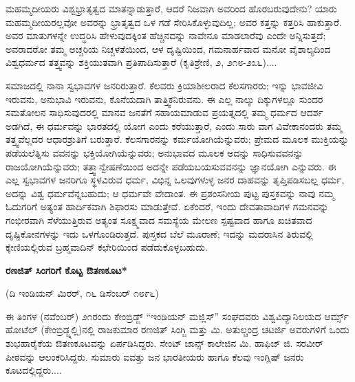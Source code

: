 ಮಹಮ್ಮದೀಯರು ವಿಶ್ವಭ್ರಾತೃತ್ವದ ಮಾತನ್ನಾಡುತ್ತಾರೆ, ಆದರೆ ನಿಜವಾಗಿ ಅವರಿಂದ ಹೊರಬರುವುದೇನು? ಯಾರು ಮಹಮ್ಮದೀಯರಲ್ಲವೋ ಅವರನ್ನು ಭ್ರಾತೃತ್ವದ ಒಳ ಗಡೆ ಸೇರಿಸಿಕೊಳ್ಳುವುದಿಲ್ಲ; ಅವರ ಕತ್ತನ್ನು ಕತ್ತರಿಸಿ ಹಾಕುತ್ತಾರೆ. ಅವರ ಮಾತುಗಳನ್ನೇ ಉದ್ಧರಿಸಿ ಹೇಳುವುದಕ್ಕಿಂತ ಹೆಚ್ಚಿನದನ್ನು ನಾವೇನೂ ಮಾಡಲಾರೆವು ಎಂದೇ ಅನ್ನಿಸುತ್ತದೆ; ಅವರಾದರೋ ತಮ್ಮ ಅಚ್ಚರಿಯ ನಿಚ್ಚಳತೆಯಿಂದ, ಆಳ ದೃಷ್ಟಿಯಿಂದ, ಗಮನಾರ್ಹವಾದ ಮನೋ ವೈಶಾಲ್ಯದಿಂದ ವಿಶ್ವಧರ್ಮದ ತತ್ತ್ವವನ್ನು ಶಕ್ತಿಯುತವಾಗಿ ಪ್ರತಿಪಾದಿಸುತ್ತಾರೆ (ಕೃತಿಶ್ರೇಣಿ, ೨, ೨೧೮-೨೩೬)....

ಸಮಾಜದಲ್ಲಿ ನಾನಾ ಸ್ವಭಾವಗಳ ಜನರಿರುತ್ತಾರೆ. ಕೆಲವರು ಕ್ರಿಯಾಶೀಲರಾದ ಕೆಲಸಗಾರರು; ಇನ್ನು ಭಾವಜೀವಿ ಇರುವನು, ಅನುಭಾವಿ ಇರುವನು, ಕೊನೆಯದಾಗಿ ತಾತ್ತ್ವಿಕನಿರುವನು. ಈ ಎಲ್ಲ ನಾಲ್ಕು ದಿಕ್ಕುಗಳಲ್ಲೂ ಸುಂದರ ಸಮತೋಲನ ಸಾಧಿಸುವುದರಲ್ಲಿ ಮಾನವ ಜನತೆಗೆ ಸಹಾಯಮಾಡುವ ಪ್ರಯತ್ನದಲ್ಲಿ ತಮ್ಮ ಧರ್ಮದ ಆದರ್ಶ ಅಡಗಿದೆ, ಈ ಧರ್ಮವನ್ನು ಭಾರತದಲ್ಲಿ ಯೋಗ ಎಂದು ಕರೆಯುತ್ತಾರೆ, ಎಂದು ಸಾರು ವಾಗ ವಿವೇಕಾನಂದರು ತಮ್ಮ ತತ್ತ್ವವೆಲ್ಲದರ ಆಧಾರಶ್ರುತಿಗೆ ಬರುತ್ತಾರೆ. ಕೆಲಸಗಾರನನ್ನು ಕರ್ಮಯೋಗಿಯೆನ್ನುವರು; ಪ್ರೇಮದ ಮೂಲಕ ಮುಕ್ತಿಯನ್ನು ಪಡೆಯಲೆತ್ನಿಸು ವವನನ್ನು ಭಕ್ತಿಯೋಗಿಯೆನ್ನುವರು; ಅನುಭಾವದ ಮೂಲಕ ಅದನ್ನು ಸಾಧಿಸುವವನನ್ನು ರಾಜಯೋಗಿಯೆನ್ನುವರು; ತತ್ತ್ವಾನ್ವೇಷಣೆಯಿಂದ ಅದನ್ನೇ ಪಡೆಯಬಯಸುವವನನ್ನು ಜ್ಞಾನಯೋಗಿ ಎನ್ನುವರು. ಈ ಎಲ್ಲ ಸ್ವಭಾವಗಳ ಜನರಿಗೂ ಸ್ಥಳವಿರುವ ಧರ್ಮ, ವಿಭಿನ್ನ ಒಲವುಗಳುಳ್ಳ ಜನರ ದಾಹವನ್ನು ತೃಪ್ತಿಪಡಿಸಬಲ್ಲ ಧರ್ಮ, ಅದನ್ನು ವಿಶ್ವ ಧರ್ಮವೆನ್ನಬಹುದು; ಆ ಧರ್ಮವೇ ವೇದಾಂತ. ಈ ಪ್ರಶಂಸನೀಯ ಪುಟ್ಟ ಪುಸ್ತಕವನ್ನು ನಾವು ನಮ್ಮ ಓದುಗರಿಗೆ ಅತ್ಯಂತ ಹಾರ್ದಿಕವಾಗಿ ಶಿಫಾರಸು ಮಾಡುತ್ತೇವೆ. ಏಕೆಂದರೆ, ಇಂದು ದೇವತಾವಾದಿಗಳ ಗಮನವನ್ನು ಗಂಭೀರವಾಗಿ ಸೆಳೆಯುತ್ತಿರುವ ಅತ್ಯಂತ ಸೂಕ್ಷ್ಮವಾದ ಸಮಸ್ಯೆಯ ಮೇಲಣ ಸ್ಪಷ್ಟವಾದ ಹಾಗೂ ಖಚಿತವಾದ ದೃಷ್ಟಿಕೋನಗಳನ್ನು ಇದು ಒಳಗೊಂಡಿರುತ್ತದೆ. ಪುಸ್ತಕದ ಬೆಲೆ ಮೂರಾಣೆ; ಇದನ್ನು ಮದರಾಸಿನ ತಿರುವಲ್ಲಿ ಕ್ಕೇಣಿಯಲ್ಲಿರುವ ಬ್ರಹ್ಮವಾದಿನ್ ಕಛೇರಿಯಿಂದ ಪಡೆದುಕೊಳ್ಳಬಹುದು.

\begin{center}
\textbf{ರಣಜಿತ್ ಸಿಂಗರಿಗೆ ಕೊಟ್ಟ ಔತಣಕೂಟ*}
\end{center}

\begin{center}
(ದಿ ಇಂಡಿಯನ್ ಮಿರರ್, ೧೬ ಡಿಸೆಂಬರ್ ೧೮೯೬)
\end{center}

ಈ ತಿಂಗಳ (ನವೆಂಬರ್) ೨೧ರಂದು ಕೇಂಬ್ರಿಡ್ಜ್ “ಇಂಡಿಯನ್ ಮಜ್ಲಿಸ್” ಸಂಘದವರು ವಿಶ್ವವಿದ್ಯಾನಿಲಯದ ಆರ್ಮ್ಸ್ ಹೋಟೆಲ್ (ಕೇಂಬ್ರಿಡ್ಜ್ನಲ್ಲಿ)ನಲ್ಲಿ ರಾಜಕುಮಾರ ರಣಜಿತ್ ಸಿಂಗ್ಜಿ ಮತ್ತು ಮಿ. ಅತುಲ್ಚಂದ್ರ ಚಟರ್ಜಿ ಅವರುಗಳಿಗೆ ಒಂದು ಶುಭಹಾರೈಕೆಯ ಔತಣಕೂಟವನ್ನು ಏರ್ಪಡಿಸಿದ್ದರು. ಸೇಂಟ್ ಜಾನ್ಸ್ ಕಾಲೇಜಿನ ಮಿ. ಹಾಫಿಜ್ ಜಿ. ಸರವೀರ್ ಪೀಠವನ್ನು ಆಲಂಕರಿಸಿದ್ದರು. ಸುಮಾರು ಐವತ್ತು ಜನ ಭಾರತೀಯರು ಹಾಗೂ ಕೆಲವು ಇಂಗ್ಲಿಷ್ ಜನರು ಕೂಟದಲ್ಲಿದ್ದರು....

